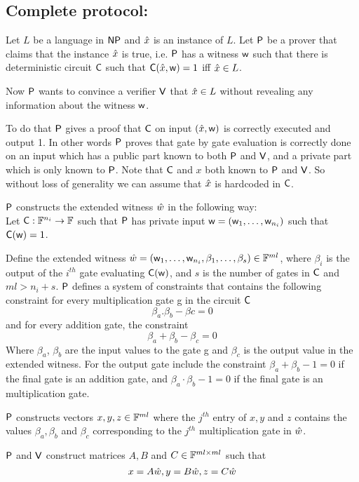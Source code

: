 \subsection{\textbf{Complete protocol:}}\label{completeprotocol} Let $L$ be a language in $\mathsf{NP}$ and $\hat{x}$ is an instance of $L$. Let $\mathsf{P}$ be a prover that claims that the instance $\hat{x}$ is true, i.e. $\mathsf{P}$ has a witness $\mathsf{w}$ such that there is deterministic circuit $\mathsf{C}$ such that $\mathsf{C}(\hat{x},\mathsf{w})=1$ iff $\hat{x} \in L$. 

Now $\mathsf{P}$ wants to convince a verifier $\mathsf{V}$ that $\hat{x}\in L$ without revealing any information about the witness $\mathsf{w}$. 

To do that $\mathsf{P}$ gives a proof that $\mathsf{C}$ on input $(\hat{x}, \mathsf{w})$ is correctly executed and output 1. In other words $\mathsf{P}$ proves that gate by gate evaluation is correctly done on an input which has a public part known to both $\mathsf{P}$ and $\mathsf{V}$, and a private part which is only known to $\mathsf{P}$. 
Note that $\mathsf{C}$ and $x$ both known to $\mathsf{P}$ and $\mathsf{V}$. So without loss of generality we can assume that $\hat{x}$ is hardcoded in $\mathsf{C}$.

$\mathsf{P}$ constructs the extended witness $\hat{w}$ in the following way: \\
Let $\mathsf{C}:\mathbb{F}^{n_i}\rightarrow \mathbb{F}$ such that $\mathsf{P}$ has private input $\mathsf{w} = (\mathsf{w}_1,\ldots, \mathsf{w}_{n_i})$ such that $\mathsf{C}(\mathsf{w})=1$.

Define the extended witness $\hat{w} = (\mathsf{w}_1,\ldots,\mathsf{w}_{n_i}, \beta_1,\ldots, \beta_s) \in \mathbb{F}^{ml}$, where $\beta_i$ is the output of the $i^{th}$ gate evaluating $\mathsf{C}(\mathsf{w})$, and $s$ is the number of gates in $\mathsf{C}$ and $ml>n_i + s$. $\mathsf{P}$ defines a system of constraints that contains the following constraint for every multiplication gate g in the circuit $\mathsf{C}$ $$\beta_{a}.\beta_{b}-\beta{c}=0$$
and for every addition gate, the constraint 
$$\beta_a + \beta_b - \beta_c = 0$$
Where $\beta_a$, $\beta_b$ are the input values to the gate g and $\beta_c$ is the output value in the extended witness. For the output gate include the constraint $\beta_a + \beta_b - 1 = 0$ if the final gate is an addition gate, and $\beta_a\cdot \beta_b - 1 = 0$ if the final gate is an multiplication gate. 

$\mathsf{P}$ constructs vectors $x,y,z \in \mathbb{F}^{ml}$ where the $j^{th}$ entry of $x,y$ and $z$ contains the values $\beta_a, \beta_b$ and $\beta_c$ corresponding to the $j^{th}$ multiplication gate in $\hat{w}$.

$\mathsf{P}$ and $\mathsf{V}$ construct matrices $A, B$ and $C \in \mathbb{F}^{ml \times ml}$ such that 
$$x = A \hat{w}, y= B \hat{w}, z= C \hat{w}$$

